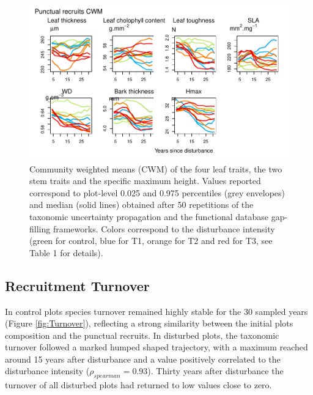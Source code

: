 \documentclass[fleqn,10pt]{ArtEcoFoG} %
\begin{document}
\begin{figure}

{\centering \includegraphics[width=0.8\linewidth]{RecruitmentTrajectories_files/figure-latex/CWM-1} 

}

\caption{Community weighted means (CWM) of the four leaf traits, the two stem traits and the specific maximum height. Values reported correspond to plot-level 0.025 and 0.975 percentiles (grey envelopes) and median (solid lines) obtained after 50 repetitions of the taxonomic uncertainty propagation and the functional database gap-filling frameworks. Colors correspond to the disturbance intensity (green for control, blue for T1, orange for T2 and red for T3, see Table 1 for details).}\label{fig:CWM}
\end{figure}

\subsection{Recruitment Turnover}\label{recruitment-turnover}

In control plots species turnover remained highly stable for the 30
sampled years (Figure \ref{fig:Turnover}), reflecting a strong
similarity between the initial plots composition and the punctual
recruits. In disturbed plots, the taxonomic turnover followed a marked
humped shaped trajectory, with a maximum reached around 15 years after
disturbance and a value positively correlated to the disturbance
intensity (\(\rho_{spearman}=0.93\)). Thirty years after disturbance the
turnover of all disturbed plots had returned to low values close to
zero.
\end{document}
